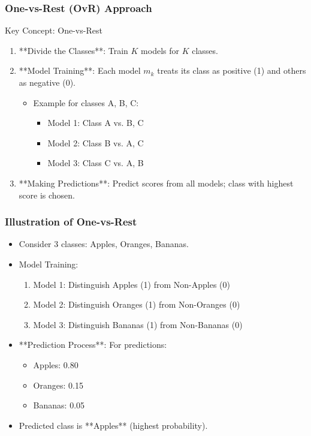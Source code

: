 \documentclass[aspectratio=169]{beamer}
\begin{document}
\begin{frame}[fragile]
    \frametitle{One-vs-Rest (OvR) Approach}
    \begin{block}{Key Concept: One-vs-Rest}
        \begin{enumerate}
            \item **Divide the Classes**: Train \( K \) models for \( K \) classes.
            \item **Model Training**: Each model \( m_k \) treats its class as positive (1) and others as negative (0).
                \begin{itemize}
                    \item Example for classes {A, B, C}:
                    \begin{itemize}
                        \item Model 1: Class A vs. {B, C}
                        \item Model 2: Class B vs. {A, C}
                        \item Model 3: Class C vs. {A, B}
                    \end{itemize}
                \end{itemize}
            \item **Making Predictions**: Predict scores from all models; class with highest score is chosen.
        \end{enumerate}
    \end{block}
\end{frame}

\begin{frame}[fragile]
    \frametitle{Illustration of One-vs-Rest}
    \begin{itemize}
        \item Consider 3 classes: Apples, Oranges, Bananas.
        \item Model Training:
        \begin{enumerate}
            \item Model 1: Distinguish Apples (1) from Non-Apples (0)
            \item Model 2: Distinguish Oranges (1) from Non-Oranges (0)
            \item Model 3: Distinguish Bananas (1) from Non-Bananas (0)
        \end{enumerate}
        \item **Prediction Process**: For predictions:
        \begin{itemize}
            \item Apples: 0.80
            \item Oranges: 0.15
            \item Bananas: 0.05
        \end{itemize}
        \item Predicted class is **Apples** (highest probability).
    \end{itemize}
\end{frame}
\end{document}
